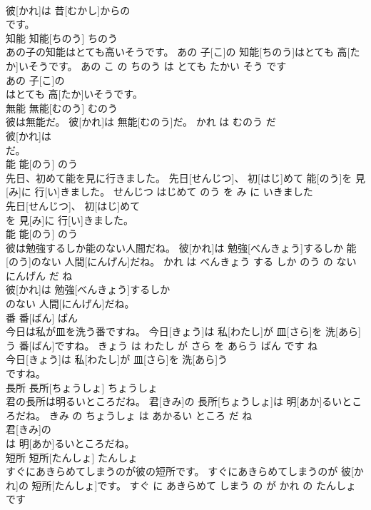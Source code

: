 \documentclass[8pt]{extreport}
\begin{document}
\begin{CJK}{UTF8}{min}
\\	彼[かれ]は 昔[むかし]からの
\\	です。			
\\	知能	知能[ちのう]	ちのう	
\\	あの子の知能はとても高いそうです。	あの 子[こ]の 知能[ちのう]はとても 高[たか]いそうです。	あの こ の ちのう は とても たかい そう です	
\\	あの 子[こ]の
\\	はとても 高[たか]いそうです。			
\\	無能	無能[むのう]	むのう	
\\	彼は無能だ。	彼[かれ]は 無能[むのう]だ。	かれ は むのう だ	
\\	彼[かれ]は
\\	だ。			
\\	能	能[のう]	のう	
\\	先日、初めて能を見に行きました。	先日[せんじつ]、 初[はじ]めて 能[のう]を 見[み]に 行[い]きました。	せんじつ はじめて のう を み に いきました	
\\	先日[せんじつ]、 初[はじ]めて
\\	を 見[み]に 行[い]きました。			
\\	能	能[のう]	のう	
\\	彼は勉強するしか能のない人間だね。	彼[かれ]は 勉強[べんきょう]するしか 能[のう]のない 人間[にんげん]だね。	かれ は べんきょう する しか のう の ない にんげん だ ね	
\\	彼[かれ]は 勉強[べんきょう]するしか
\\	のない 人間[にんげん]だね。			
\\	番	番[ばん]	ばん	
\\	今日は私が皿を洗う番ですね。	今日[きょう]は 私[わたし]が 皿[さら]を 洗[あら]う 番[ばん]ですね。	きょう は わたし が さら を あらう ばん です ね	
\\	今日[きょう]は 私[わたし]が 皿[さら]を 洗[あら]う
\\	ですね。			
\\	長所	長所[ちょうしょ]	ちょうしょ	
\\	君の長所は明るいところだね。	君[きみ]の 長所[ちょうしょ]は 明[あか]るいところだね。	きみ の ちょうしょ は あかるい ところ だ ね	
\\	君[きみ]の
\\	は 明[あか]るいところだね。			
\\	短所	短所[たんしょ]	たんしょ	
\\	すぐにあきらめてしまうのが彼の短所です。	すぐにあきらめてしまうのが 彼[かれ]の 短所[たんしょ]です。	すぐ に あきらめて しまう の が かれ の たんしょ です	

\end{CJK}
\end{document}
